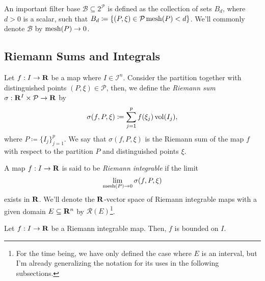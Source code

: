 An important filter base \(\mathcal B \subseteq 2^{\mathcal P}\) is
defined as the collection of sets \(B_d\), where \(d > 0\) is a scalar, such
that \(B_d \coloneq \{(P, \xi) \in \mathcal P \relax \operatorname{mesh}(P) < d\}\). We'll commonly
denote \(\mathcal B\) by \(\operatorname{mesh}(P) \to 0\).

\subsection{Riemann Sums and Integrals}

\begin{definition}
    \label{def:riemann-sum}
    Let \(f: I \to \mathbf{R}\) be a map where \(I \in \mathcal I^n\). Consider the
    partition together with distinguished points \((P, \xi) \in \mathcal P\), then,
    we define the \emph{Riemann sum} \(\sigma: \mathbf{R}^I \times \mathcal P \to \mathbf{R}\) by
    \[
        \sigma(f, P, \xi) \coloneq \sum_{j=1}^p f(\xi_j) \operatorname{vol}(I_j),
    \]
    where \(P \coloneq \{I_{j}\}_{j=1}^p\). We say that \(\sigma(f, P, \xi)\) is the
    Riemann sum of the map \(f\) with respect to the partition \(P\) and
    distinguished points \(\xi\).
\end{definition}

\begin{definition}
    \label{def:riemann-integrable}
    A map \(f: I \to \mathbf{R}\) is said to be \emph{Riemann integrable} if the limit
    \[
        \lim_{\operatorname{mesh}(P) \to 0} \sigma(f, P, \xi)
    \]
    exists in \(\mathbf{R}\). We'll denote the \(\mathbf{R}\)-vector space of Riemann integrable
    maps with a given domain \(E \subseteq \mathbf{R}^n\) by \(\mathcal R(E)\)\footnote{For
        the time being, we have only defined the case where \(E\) is an interval, but
        I'm already generalizing the notation for its uses in the following
        subsections.}.
\end{definition}

\begin{proposition}
    \label{prop:riemann-integral-map-bounded}
    Let \(f: I \to \mathbf{R}\) be a Riemann integrable map. Then, \(f\) is bounded on \(I\).
\end{proposition}

